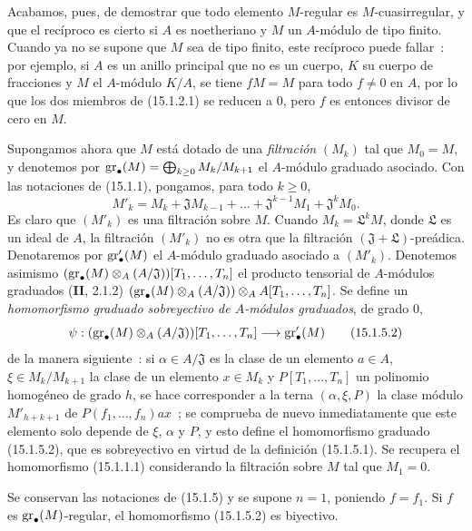Acabamos, pues, de demostrar que todo elemento $M$-regular es
$M$-cuasirregular, y que el recíproco es cierto si $A$ es noetheriano y $M$
un $A$-módulo de tipo finito. Cuando ya no se supone que $M$ sea de tipo
finito, este recíproco puede fallar~: por ejemplo, si $A$ es un anillo
principal que no es un cuerpo, $K$ su cuerpo de fracciones y $M$ el
$A$-módulo $K/A$, se tiene $fM=M$ para todo $f\neq0$ en $A$, por lo que los
dos miembros de (15.1.2.1) se reducen a $0$, pero $f$ es entonces divisor de
cero en $M$.


\begin{env}[15.1.5]
\label{0.15.1.5-fr}

Supongamos ahora que $M$ está dotado de una \emph{filtración} $(M_k)$ tal que
$M_0=M$, y denotemos por
$\operatorname{gr}_\bullet(M)=\bigoplus_{k\geq0}M_k/M_{k+1}$ el $A$-módulo graduado asociado.
Con las notaciones de (15.1.1), pongamos, para todo $k\geq0$,
\[
  M'_k=M_k+\mathfrak{J}M_{k-1}+\ldots+
  \mathfrak{J}^{k-1}M_1+\mathfrak{J}^kM_0.
  \tag{15.1.5.1}\label{0.15.1.5.1-fr}
\]
Es claro que $(M'_k)$ es una filtración sobre $M$. Cuando
$M_k=\mathfrak{L}^kM$, donde $\mathfrak L$ es un ideal de $A$, la filtración
$(M'_k)$ no es otra que la filtración
$(\mathfrak{J}+\mathfrak{L})$-preádica. Denotaremos por
$\operatorname{gr}'_\bullet(M)$ el $A$-módulo graduado asociado a $(M'_k)$. Denotemos asimismo
$(\operatorname{gr}_\bullet(M)\otimes_A(A/\mathfrak{J}))[T_1,\ldots,T_n]$
el producto tensorial de $A$-módulos graduados (\textbf{II}, 2.1.2)
$(\operatorname{gr}_\bullet(M)\otimes_A(A/\mathfrak{J}))\otimes_A A[T_1,\ldots,T_n]$.
Se define un \emph{homomorfismo graduado sobreyectivo de $A$-módulos graduados},
de grado $0$,
\[
  \psi:(\operatorname{gr}_\bullet(M)\otimes_A(A/\mathfrak{J}))[T_1,\ldots,T_n]
  \longrightarrow\operatorname{gr}'_\bullet(M)
  \tag{15.1.5.2}\label{0.15.1.5.2-fr}
\]
de la manera siguiente~: si $\alpha\in A/\mathfrak{J}$ es la clase de un
elemento $a\in A$, $\xi\in M_k/M_{k+1}$ la clase de un elemento $x\in M_k$ y
$P[T_1,\ldots,T_n]$ un polinomio homogéneo de grado $h$, se hace corresponder
a la terna $(\alpha,\xi,P)$ la clase módulo $M'_{h+k+1}$ de
$P(f_1,\ldots,f_n)ax$~; se comprueba de nuevo inmediatamente que este elemento
solo depende de $\xi$, $\alpha$ y $P$, y esto define el homomorfismo graduado
(15.1.5.2), que es sobreyectivo en virtud de la definición (15.1.5.1). Se
recupera el homomorfismo (15.1.1.1) considerando la filtración sobre $M$ tal
que $M_1=0$.
\end{env}

\begin{lemma}[15.1.6]
\label{0.15.1.6-fr}
Se conservan las notaciones de (15.1.5) y se supone $n=1$, poniendo $f=f_1$.
Si $f$ es $\operatorname{gr}_\bullet(M)$-regular, el homomorfismo (15.1.5.2) es biyectivo.
\end{lemma}

